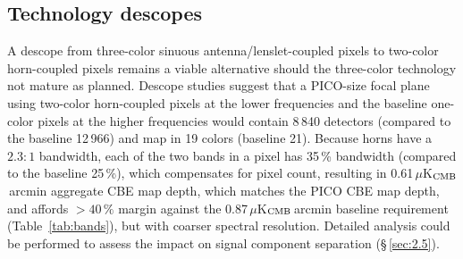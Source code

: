 








\subsection{Technology descopes}
\label{sec:technology_descopes} %

A descope from three-color sinuous antenna/lenslet-coupled pixels to two-color horn-coupled pixels remains a viable
alternative should the three-color technology not mature as
planned. Descope studies suggest that a PICO-size focal plane using
two-color horn-coupled pixels at the lower frequencies and the baseline one-color
pixels at the higher frequencies would contain 8\,840 detectors
(compared to the baseline 12\,966) and map in 19 colors (baseline
21). Because horns have a $2.3:1$ bandwidth, each of the two bands in
a pixel has 35\,\% bandwidth (compared to the baseline 25\,\%), which
compensates for pixel count, resulting in
0.61\,$\mu$K$_{\rm CMB}$\,arcmin aggregate CBE map depth, which
matches the PICO CBE map depth, and affords $>40\,\%$ margin against
the 0.87\,$\mu$K$_{\rm CMB}$\,arcmin baseline requirement
(Table~\ref{tab:bands}), but with coarser spectral resolution.
Detailed analysis could be performed to assess the impact on signal component separation (\S\,\ref{sec:2.5}).

